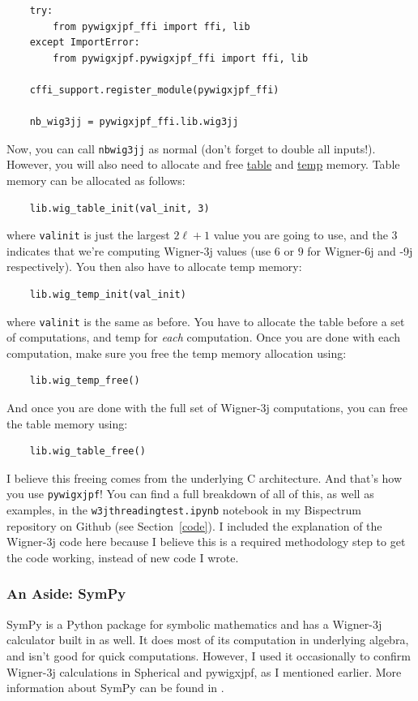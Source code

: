\documentclass[11pt]{article}
\renewcommand{\_}[1]{\underline{ #1 }}
\begin{document}
{\begin{verbatim}
    try:
        from pywigxjpf_ffi import ffi, lib
    except ImportError:
        from pywigxjpf.pywigxjpf_ffi import ffi, lib

    cffi_support.register_module(pywigxjpf_ffi)

    nb_wig3jj = pywigxjpf_ffi.lib.wig3jj
\end{verbatim}

Now, you can call \texttt{nb\textunderscore wig3jj} as normal (don't forget to double all inputs!). However, you will also need to allocate and free \underline{table} and \underline{temp} memory. Table memory can be allocated as follows:
\begin{verbatim}
    lib.wig_table_init(val_init, 3)
\end{verbatim}

where \texttt{val\textunderscore init} is just the largest $2\ell + 1$ value you are going to use, and the $3$ indicates that we're computing Wigner-3j values (use $6$ or $9$ for Wigner-6j and -9j respectively). You then also have to allocate temp memory:
\begin{verbatim}
    lib.wig_temp_init(val_init)
\end{verbatim}

where \texttt{val\textunderscore init} is the same as before. You have to allocate the table before a set of computations, and temp for \textit{each} computation. Once you are done with each computation, make sure you free the temp memory allocation using:
\begin{verbatim}
    lib.wig_temp_free()
\end{verbatim}

And once you are done with the full set of Wigner-3j computations, you can free the table memory using:
\begin{verbatim}
    lib.wig_table_free()
\end{verbatim}

I believe this freeing comes from the underlying C architecture. And that's how you use \texttt{pywigxjpf}! You can find a full breakdown of all of this, as well as examples, in the \texttt{w3j\textunderscore threading\textunderscore test.ipynb} notebook in my Bispectrum repository on Github (see Section~\ref{code}). I included the explanation of the Wigner-3j code here because I believe this is a required methodology step to get the code working, instead of new code I wrote.

\subsubsection{An Aside: SymPy}

SymPy is a Python package for symbolic mathematics and has a Wigner-3j calculator built in as well. It does most of its computation in underlying algebra, and isn't good for quick computations. However, I used it occasionally to confirm Wigner-3j calculations in Spherical and pywigxjpf, as I mentioned earlier. More information about SymPy can be found in \cite{SymPy}.


}
\end{document}
